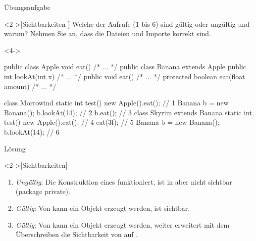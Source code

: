 \ifull
\begin{frame}[c,fragile]{Übungsaufgabe}
    \begin{exercise}<2->[Sichtbarkeiten ]
        Welche der Aufrufe (1 bis 6) sind gültig oder ungültig und warum? Nehmen Sie an, dass die Dateien und Importe korrekt sind. \par
\begin{onlyenv}<4->
\begin{minipage}{.7\linewidth}
%
\begin{plainjava}[morekeywords={[3]{Apple,Banana}},belowskip=0pt]
public class Apple { void eat() { /* ... */ } }
public class Banana extends Apple {
  public int lookAt(int x) { /* ... */ }
  public void eat() { /* ... */ }
  protected boolean eat(float amount) { /* ... */ }
}
\end{plainjava}
\begin{plainjava}[multicols=2,morekeywords={[3]{Apple,Banana,Skyrim,Morrowind}},aboveskip=0pt]
class Morrowind {
  static int test() {
    new Apple().eat(); // 1
    Banana b = new Banana();
    b.lookAt(14); // 2
    b.eat(); // 3
}}
class Skyrim extends Banana {
  static int test() {
    new Apple().eat(); // 4
    eat(3f); // 5
    Banana b = new Banana();
    b.lookAt(14); // 6
}}
\end{plainjava}
\end{minipage}%
\end{onlyenv}%
\hfill{}
    \end{exercise}
\end{frame}

\begin{frame}[c]{Lösung}
    \begin{solve}<2->[Sichtbarkeiten]
       \begin{enumerate}[<+(1)->]
            \item \emph{Ungültig}: Die Konstruktion eines  funktioniert,  ist in  aber nicht sichtbar (package private).
            \item \emph{Gültig}: Von  kann ein Objekt erzeugt werden,  ist  sichtbar.
            \item \emph{Gültig}: Von  kann ein Objekt erzeugt werden, weiter erweitert  mit dem Überschreiben die Sichtbarkeit von  auf .
       \end{enumerate}
    \end{solve}
\end{frame}

